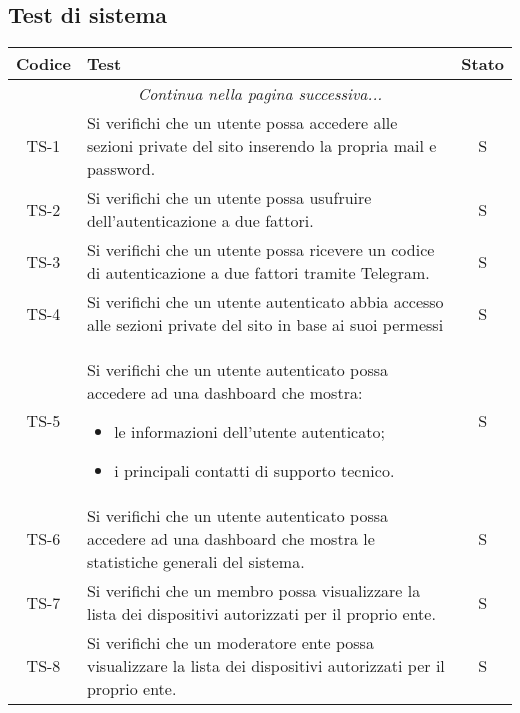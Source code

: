 	\subsection{Test di sistema}
		\begin{center}
			\begin{longtable}{|c|p{10cm}|c|}
			\hline
			\rowcolor{lighter-grayer}
			\textbf{Codice} & \textbf{Test} & \textbf{Stato}  \\
			\hline
			\endhead
			\hline
	        \multicolumn{3}{|c|}{\textit{Continua nella pagina successiva...}}\\
	        \hline
	        \endfoot
	        \endlastfoot

			\hline
			 TS-1 & Si verifichi che un utente possa accedere alle sezioni private del sito inserendo la propria mail e password.
			  & S \\
			 \hline
			 TS-2 & Si verifichi che un utente possa usufruire dell'autenticazione a due fattori. & S \\
			 \hline
			 TS-3 & Si verifichi che un utente possa ricevere un codice di autenticazione a due fattori tramite Telegram. & S \\
			 \hline
			 TS-4 & Si verifichi che un utente autenticato abbia accesso alle sezioni private del sito in base ai suoi permessi & S \\
			 \hline
			 TS-5 & Si verifichi che un utente autenticato possa accedere ad una dashboard che mostra:
			 \begin{itemize}
			 	\item le informazioni dell'utente autenticato;
			 	\item i principali contatti di supporto tecnico.
			 \end{itemize} & S \\
			 \hline
			 TS-6 & Si verifichi che un utente autenticato possa accedere ad una dashboard che mostra le statistiche generali del sistema. & S \\
			 \hline
			 TS-7 & Si verifichi che un membro possa visualizzare la lista dei dispositivi autorizzati per il proprio ente. & S \\
			 \hline
			 TS-8 & Si verifichi che un moderatore ente possa visualizzare la lista dei dispositivi autorizzati per il proprio ente. & S \\

\end{longtable}
\end{center}
